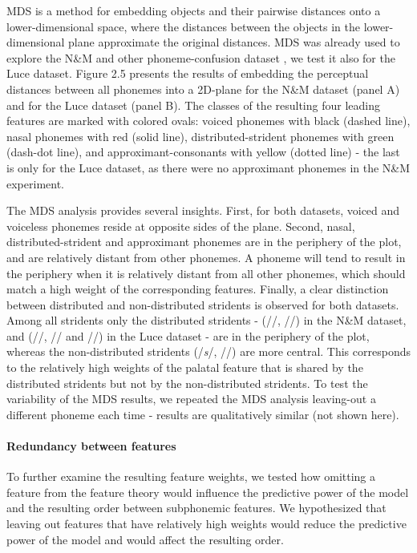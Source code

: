 MDS is a method for embedding objects and their pairwise distances onto a lower-dimensional space, where the distances between the objects in the lower-dimensional plane approximate the original distances. MDS was already used to explore the N\&M and other phoneme-confusion dataset \citep{Shepard1980, mielke2008emergence, Buchsbaum2015}, we test it also for the Luce dataset. Figure 2.5 presents the results of embedding the perceptual distances between all phonemes into a 2D-plane for the N\&M dataset (panel A) and for the Luce dataset (panel B). The classes of the resulting four leading features are marked with colored ovals: voiced phonemes with black (dashed line), nasal phonemes with red (solid line), distributed-strident phonemes with green (dash-dot line), and approximant-consonants with yellow (dotted line) - the last is only for the Luce dataset, as there were no approximant phonemes in the N\&M experiment. 

The MDS analysis provides several insights. First, for both datasets, voiced and voiceless phonemes reside at opposite sides of the plane. Second, nasal, distributed-strident and approximant phonemes are in the periphery of the plot, and are relatively distant from other phonemes. A phoneme will tend to result in the periphery when it is relatively distant from all other phonemes, which should match a high weight of the corresponding features. Finally, a clear distinction between distributed and non-distributed stridents is observed for both datasets. Among all stridents only the distributed stridents - (//, //) in the N\&M dataset, and (//, // and //) in the Luce dataset - are in the periphery of the plot, whereas the non-distributed stridents (/\textit{s}/, //) are more central. This corresponds to the relatively high weights of the palatal feature that is shared by the distributed stridents but not by the non-distributed stridents. To test the variability of the MDS results, we repeated the MDS analysis leaving-out a different phoneme each time - results are qualitatively similar (not shown here).

\paragraph{Redundancy between features} To further examine the resulting feature weights, we tested how omitting a feature from the feature theory would influence the predictive power of the model and the resulting order between subphonemic features. We hypothesized that leaving out features that have relatively high weights would reduce the predictive power of the model and would affect the resulting order.

